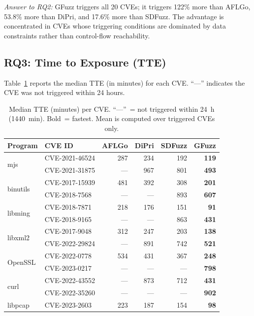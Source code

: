 \documentclass[preprint,12pt,3p]{elsarticle}
\begin{document}
\textit{Answer to RQ2:} GFuzz triggers all 20 CVEs; it triggers 122\% more
than AFLGo, 53.8\% more than DiPri, and 17.6\% more than SDFuzz.  The
advantage is concentrated in CVEs whose triggering conditions are dominated
by data constraints rather than control-flow reachability.

\subsection{RQ3: Time to Exposure (TTE)}

Table~\ref{tbl:tte} reports the median TTE (in minutes) for each CVE.
``---'' indicates the CVE was not triggered within 24 hours.

\begin{table}[t]
\centering
\small
\caption{Median TTE (minutes) per CVE. ``---''~= not triggered within 24~h
  (1440~min). Bold~= fastest. Mean is computed over triggered CVEs only.}
\label{tbl:tte}
\begin{tabular}{llrrrr}
\toprule
\textbf{Program} & \textbf{CVE ID}
  & \textbf{AFLGo} & \textbf{DiPri} & \textbf{SDFuzz} & \textbf{GFuzz} \\
\midrule
\multirow{2}{*}{mjs}
  & CVE-2021-46524 & 287  & 234  & 192  & \textbf{119} \\
  & CVE-2021-31875 & ---  & 967  & 801  & \textbf{493} \\[2pt]
\multirow{2}{*}{binutils}
  & CVE-2017-15939 & 481  & 392  & 308  & \textbf{201} \\
  & CVE-2018-7568  & ---  & ---  & 893  & \textbf{607} \\[2pt]
\multirow{2}{*}{libming}
  & CVE-2018-7871  & 218  & 176  & 151  & \textbf{91}  \\
  & CVE-2018-9165  & ---  & ---  & 863  & \textbf{431} \\[2pt]
\multirow{2}{*}{libxml2}
  & CVE-2017-9048  & 312  & 247  & 203  & \textbf{138} \\
  & CVE-2022-29824 & ---  & 891  & 742  & \textbf{521} \\[2pt]
\multirow{2}{*}{OpenSSL}
  & CVE-2022-0778  & 534  & 431  & 367  & \textbf{248} \\
  & CVE-2023-0217  & ---  & ---  & ---  & \textbf{798} \\[2pt]
\multirow{2}{*}{curl}
  & CVE-2022-43552 & ---  & 873  & 712  & \textbf{431} \\
  & CVE-2022-35260 & ---  & ---  & ---  & \textbf{902} \\[2pt]
\multirow{2}{*}{libpcap}
  & CVE-2023-2603  & 223  & 187  & 154  & \textbf{98}  \\

\end{tabular}
\end{table}
\end{document}
